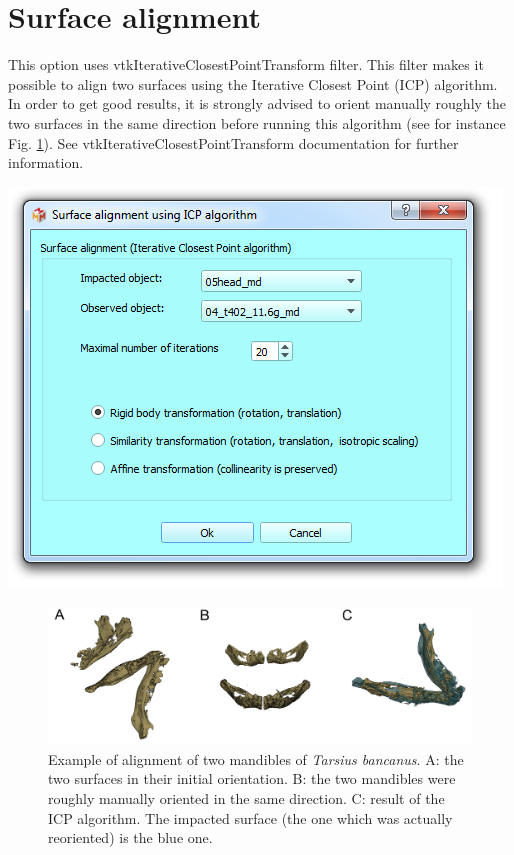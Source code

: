\section{Surface alignment}\label{surface_alignment_section}
\noindent
\begin{minipage}{0.5\textwidth}
This option uses vtkIterativeClosestPointTransform filter. This filter makes it possible to align two surfaces using the Iterative Closest Point (ICP) algorithm. In order to get good results, it is strongly advised to orient manually roughly the two surfaces in the same direction before running this algorithm 
(see for instance Fig. \ref{surface_alignment}). See vtkIterativeClosestPointTransform documentation for further information.



\end{minipage}    
\begin{minipage}{0.5\textwidth}\centering
  \includegraphics[scale=0.5]{images/09/alignment/surface_alignment_dialog.png}
 \end{minipage} 

\begin{figure}
  \centering
  \includegraphics[scale=0.21]{images/09/alignment/surface_alignment.png} 
	\caption{Example of alignment of two mandibles of \textit{Tarsius bancanus}. A: the two surfaces in their initial orientation. B: the two mandibles were roughly manually oriented in the same direction. C: result of the ICP algorithm. The impacted surface (the one which was actually reoriented) is the blue one. }
 \label{surface_alignment}
\end{figure}



